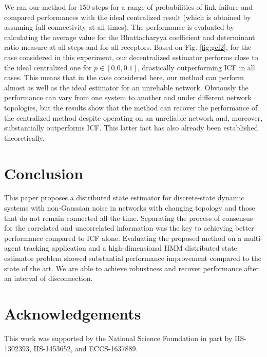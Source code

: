 \documentclass[conference]{IEEEtran}
\theoremstyle{remark}
\begin{document}
We ran our method for 150 steps for a range of probabilities of link failure 
and compared performances with the ideal centralized result (which is obtained 
by assuming full connectivity at all times). The performance is evaluated by 
calculating the average value for the Bhattacharyya coefficient and determinant 
ratio measure at all steps and for all receptors.  Based on Fig. 
\ref{fig:gcf2}, for the case considered in this experiment, our decentralized 
estimator performs close to the ideal centralized one for $p\in[0.0 ,0.1]$, 
drastically outperforming ICF in all cases. This means that in the case 
considered here, our method can perform almost as well as the ideal estimator 
for an unreliable  network. Obviously the performance can vary from one system 
to another and under different network topologies, but the results show that 
the method can recover 
the performance of the centralized method despite operating on an unreliable 
network and, moreover, 
substantially outperforms ICF. This latter fact has also already been 
established 
theoretically.

\section{Conclusion} \label{sec:conclusion}
This paper proposes a distributed state estimator for discrete-state dynamic systems with non-Gaussian noise in networks with changing topology and those that do not remain connected all the time. Separating the process of consensus for the correlated and uncorrelated information was the key to achieving better performance compared to ICF alone. Evaluating the proposed method on a multi-agent tracking application and a high-dimensional HMM distributed state estimator problem showed substantial performance improvement compared to the state of the art. We are able to achieve robustness and recover performance after an interval of disconnection. 
    
\section*{Acknowledgements}

This work was supported by the National Science Foundation 
in part by IIS-1302393, IIS-1453652, and ECCS-1637889.

\balance

\end{document}
